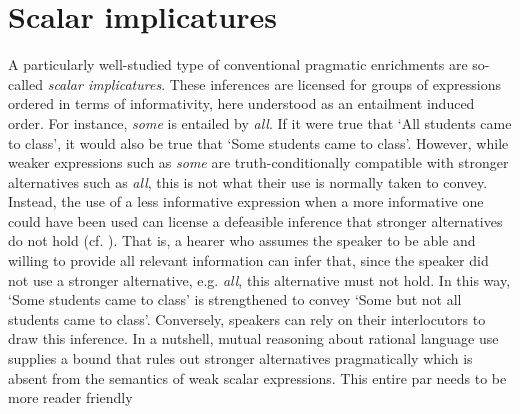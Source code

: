 \documentclass[a4paper]{article}
\newcommand{\tuple}[1]{\ensuremath{\left\langle #1 \right\rangle}}
\newcommand{\hl}[1]{\textcolor[rgb]{.8,.33,.0}{#1}}%
\begin{document}









\section{Scalar implicatures}\label{sec:si-case-study}
%
A particularly well-studied type of conventional pragmatic enrichments are so-called {\em scalar implicatures}. These inferences are licensed for groups of expressions ordered in terms of informativity, here understood as an entailment induced order. For instance, {\em some} is entailed by {\em all}. If it were true that `All students came to class', it would also be true that `Some students came to class'. However, while weaker expressions such as {\em some} are truth-conditionally compatible with stronger alternatives such as {\em all}, this is not what their use is normally taken to convey. Instead, the use of a less informative expression when a more informative one could have been used can license a defeasible inference that stronger alternatives do not hold (cf. \citealt{horn:1972,gazdar:1979}). That is, a hearer who assumes the speaker to be able and willing to provide all relevant information can infer that, since the speaker did not use a stronger alternative, e.g. {\em all}, this alternative must not hold. In this way, `Some students came to class' is strengthened to convey `Some but not all students came to class'. Conversely, speakers can rely on their interlocutors to draw this inference. In a nutshell, mutual reasoning about rational language use supplies a bound that rules out stronger alternatives pragmatically which is absent from the semantics of weak scalar expressions. \hl{This entire par needs to be more reader friendly}
\end{document}
